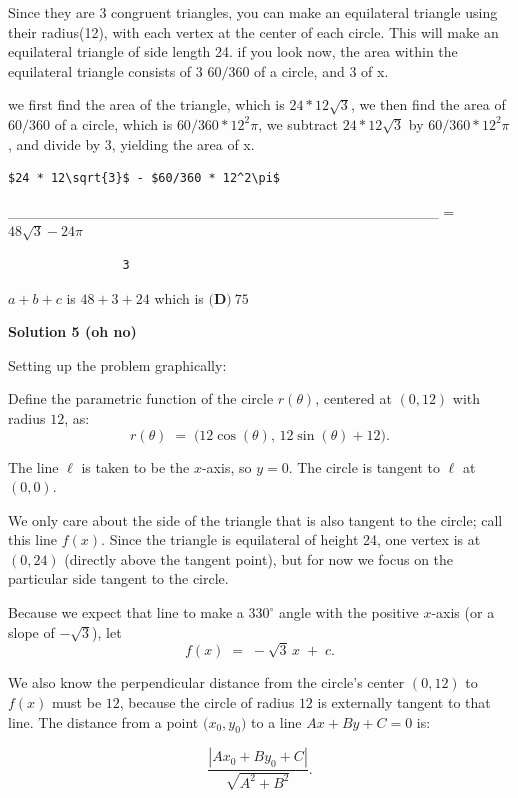 \begin{enumerate}
Since they are 3 congruent triangles, you can make an equilateral triangle using their radius(12), with each vertex at the center of each circle. This will make an equilateral triangle of side length 24. if you look now, the area within the equilateral triangle consists of 3 $60/360$ of a circle, and 3 of x.

 we first find the area of the triangle, which is $24 * 12\sqrt{3}$, we then find the area of $60/360$ of a circle, which is $60/360 * 12^2\pi$, we subtract $24 * 12\sqrt{3}$ by $60/360 * 12^2\pi$, and divide by 3, yielding the area of x.

 \begin{verbatim}
$24 * 12\sqrt{3}$ - $60/360 * 12^2\pi$
\end{verbatim}

\_\_\_\_\_\_\_\_\_\_\_\_\_\_\_\_\_\_\_\_\_\_\_\_\_\_\_\_\_\_\_\_\_\_\_\_\_\_\_\_\_ = $48\sqrt{3}-24\pi$
\begin{verbatim}
				3
\end{verbatim}


$a+b+c$ is $48+3+24$ which is $\boxed{\textbf{(D)}~75}$




\textbf{Solution 5 (oh no)}

Setting up the problem graphically:

 Define the parametric function of the circle \(r(\theta)\), centered at \((0,12)\) with radius \(12\), as:
 \[r(\theta) \;=\; \bigl(12\cos(\theta),\,12\sin(\theta) + 12\bigr).\] 

 The line \(\ell\) is taken to be the \(x\)-axis, so \(y = 0\). The circle is tangent to \(\ell\) at \((0,0)\).

 We only care about the side of the triangle that is also tangent to the circle; call this line \(f(x)\). Since the triangle is equilateral of height 24, one vertex is at \((0,24)\) (directly above the tangent point), but for now we focus on the particular side tangent to the circle.

 Because we expect that line to make a \(330^\circ\) angle with the positive \(x\)-axis (or a slope of \(-\sqrt{3}\)), let 
 \[f(x) \;=\; -\sqrt{3}\,x \;+\; c.\]

 We also know the perpendicular distance from the circle’s center \((0,12)\) to \(f(x)\) must be \(12\), because the circle of radius \(12\) is externally tangent to that line.  The distance from a point \(\bigl(x_0,y_0\bigr)\) to a line \(Ax + By + C = 0\) is: 

 
 \[\frac{|Ax_0 + By_0 + C|}{\sqrt{A^2 + B^2}}.\]


\end{enumerate}
